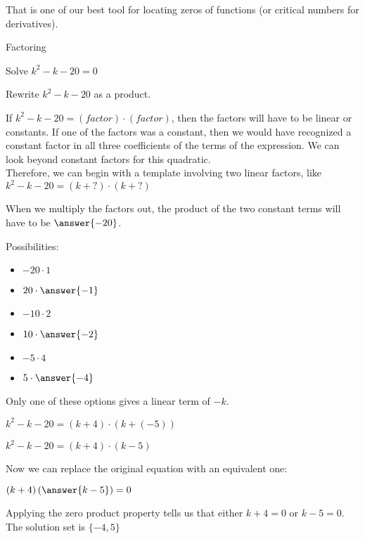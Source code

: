 \documentclass{ximera}
\begin{document}
That is one of our best tool for locating zeros of functions (or critical numbers for derivatives). \\



\begin{example} Factoring

Solve $k^2 - k - 20 = 0$ \\

\begin{explanation}



Rewrite $k^2 - k - 20$ as a product.

If $k^2 - k - 20 = (factor) \cdot (factor)$, then the factors will have to be linear or constants.  If one of the factors was a constant, then we would have recognized a constant factor in all three coefficients of the terms of the expression.  We can look beyond constant factors for this quadratic. \\

Therefore, we can begin with a template involving two linear factors, like $k^2 - k - 20 = (k + ?) \cdot (k + ?)$

When we multiply the factors out, the product of the two constant terms will have to be $\answer{-20}$.

Possibilities:
\begin{itemize}
\item $-20 \cdot 1$
\item $20 \cdot \answer{-1}$
\item $-10 \cdot 2$
\item $10 \cdot \answer{-2}$
\item $-5 \cdot 4$
\item $5 \cdot \answer{-4}$
\end{itemize}



Only one of these options gives a linear term of $-k$.


$k^2 - k - 20 = (k + 4) \cdot (k + (-5))$

$k^2 - k - 20 = (k + 4) \cdot (k - 5)$



Now we can replace the original equation with an equivalent one:


$(k + 4) \left( \answer{k - 5} \right) = 0$



Applying the zero product property tells us that either $k + 4 = 0$ or $k - 5 = 0$.  \\

The solution set is $\{ -4, 5 \}$



\end{explanation}

\end{example}
\end{document}
